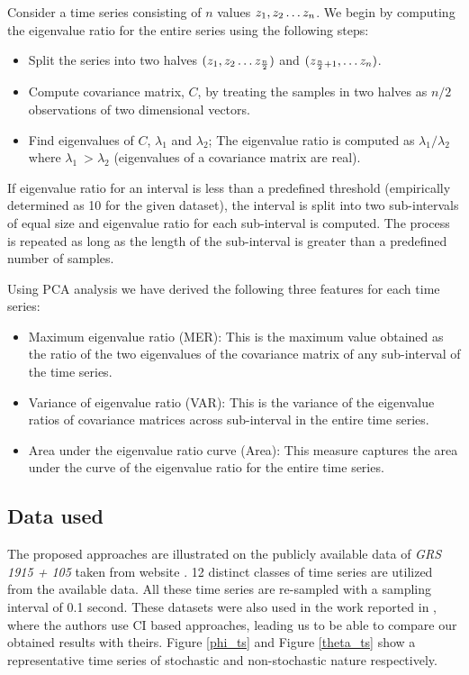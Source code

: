\documentclass[10pt,conference]{IEEEtran}
\begin{document}
Consider a time series consisting of $n$ values  $z_1, z_2 \mathellipsis z_n$. We begin by computing the eigenvalue ratio for the entire series using the following steps:
\begin{itemize}
 \item  Split the series into two halves $(z_1, z_2 \mathellipsis z_{\frac{n}{2}})$ and $(z_{\frac{n}{2} + 1}, \mathellipsis z_n)$.
 \item Compute covariance matrix, $C$,  by treating the samples in two halves as $n/2$ observations of two dimensional vectors.
 \item Find eigenvalues of $C$, $\lambda_1$ and $\lambda_2$; The eigenvalue ratio is computed as  $\lambda_1/\lambda_2$ where $\lambda_1 \ > \lambda_2$ (eigenvalues of a covariance matrix are real).
\end{itemize}
If eigenvalue ratio for an interval is less than a predefined threshold (empirically determined as 10 for the given dataset), the interval is split into two sub-intervals of equal size and eigenvalue ratio for each sub-interval is computed. The process is repeated as long as the length of the sub-interval is greater than a predefined number of samples.

Using PCA analysis we have derived the following three features for each time series:
\begin{itemize}
 \item Maximum eigenvalue ratio (MER): This is the maximum value obtained as the ratio of the two eigenvalues of the covariance matrix of any sub-interval of the time series.
 \item Variance of eigenvalue ratio (VAR): This is the variance of the eigenvalue ratios of covariance matrices across sub-interval in the entire time series.
 \item Area under the eigenvalue ratio curve (Area): This measure captures the area under the curve of the eigenvalue ratio for the entire time series.
\end{itemize}

\subsection{Data used}
The proposed approaches are illustrated on the publicly available data of \textit{GRS 1915 + 105} taken from website \cite{xte}. 12 distinct classes of time series are utilized from the available data. All these time series are re-sampled with a sampling interval of 0.1 second. These datasets  were  also used in the work reported in \cite{Adegoke2018}, where the authors use CI based approaches, leading us to be able to compare our obtained results with theirs. Figure \ref{phi_ts} and Figure \ref{theta_ts} show a representative time series of stochastic and non-stochastic  nature respectively.
\end{document}
